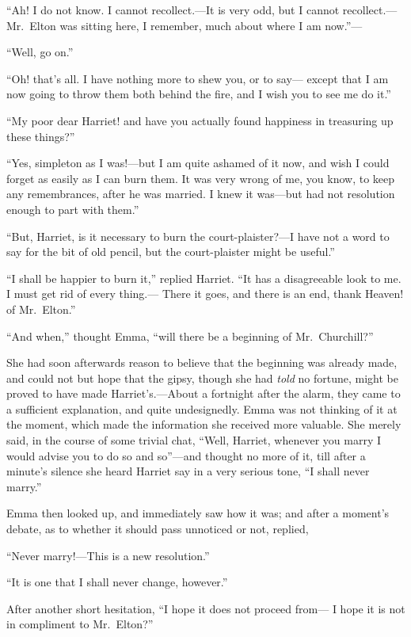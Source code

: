 ``Ah!  I do not know.  I cannot recollect.---It is very odd,
but I cannot recollect.---Mr.\ Elton was sitting here, I remember,
much about where I am now.''---%

``Well, go on.''

``Oh! that's all.  I have nothing more to shew you, or to say---%
except that I am now going to throw them both behind the fire,
and I wish you to see me do it.''

``My poor dear Harriet! and have you actually found happiness
in treasuring up these things?''

``Yes, simpleton as I was!---but I am quite ashamed of it now, and wish
I could forget as easily as I can burn them.  It was very wrong
of me, you know, to keep any remembrances, after he was married.
I knew it was---but had not resolution enough to part with them.''

``But, Harriet, is it necessary to burn the court-plaister?---I have
not a word to say for the bit of old pencil, but the court-plaister
might be useful.''

``I shall be happier to burn it,'' replied Harriet.  ``It has
a disagreeable look to me.  I must get rid of every thing.---%
There it goes, and there is an end, thank Heaven! of Mr.\ Elton.''

``And when,'' thought Emma, ``will there be a beginning of Mr.\ Churchill?''

She had soon afterwards reason to believe that the beginning was
already made, and could not but hope that the gipsy, though she had
\emph{told} no fortune, might be proved to have made Harriet's.---About a
fortnight after the alarm, they came to a sufficient explanation,
and quite undesignedly.  Emma was not thinking of it at the moment,
which made the information she received more valuable.
She merely said, in the course of some trivial chat, ``Well, Harriet,
whenever you marry I would advise you to do so and so''---and thought
no more of it, till after a minute's silence she heard Harriet
say in a very serious tone, ``I shall never marry.''

Emma then looked up, and immediately saw how it was; and after a
moment's debate, as to whether it should pass unnoticed or not, replied,

``Never marry!---This is a new resolution.''

``It is one that I shall never change, however.''

After another short hesitation, ``I hope it does not proceed from---%
I hope it is not in compliment to Mr.\ Elton?''

